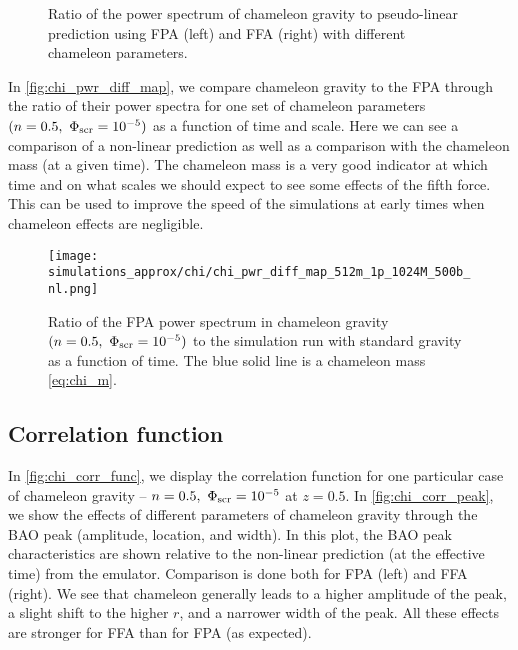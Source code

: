 \begin{figure*}[!tb]
  \centering
	\begin{subfigure}{1.2\textwidth}
		\chileft
	\end{subfigure}
	\begin{subfigure}{0.5\textwidth}
	\end{subfigure}%
	\begin{subfigure}{0.5\textwidth}
	\end{subfigure}
  \caption{Ratio of the power spectrum of chameleon gravity to pseudo-linear prediction using FPA (left) and FFA (right) with different chameleon parameters.}
  \label{fig:CHI_FP_diff_lin_ratio}
\end{figure*}

In \autoref{fig:chi_pwr_diff_map}, we compare chameleon gravity to the FPA through the ratio of their power spectra for one set of chameleon parameters $(n=0.5,\ \Phi_{\text{\scriptsize scr}}=10^{-5})$ as a function of time and scale. Here we can see a comparison of a non-linear prediction as well as a comparison with the chameleon mass (at a given time). The chameleon mass is a very good indicator at which time and on what scales we should expect to see some effects of the fifth force. This can be used to improve the speed of the simulations at early times when chameleon effects are negligible.
\begin{figure}[tb]
	\centering
	\chileft
	\texttt{[image: simulations\_approx/chi/chi\_pwr\_diff\_map\_512m\_1p\_1024M\_500b\_nl.png]}
	\caption{Ratio of the FPA power spectrum in chameleon gravity $(n=0.5,\ \Phi_{\text{\scriptsize scr}}=10^{-5})$ to the simulation run with standard gravity as a function of time. The blue solid line is a chameleon mass \eqref{eq:chi_m}.}
	\label{fig:chi_pwr_diff_map}
\end{figure}

\subsection{Correlation function}
In \autoref{fig:chi_corr_func}, we display the correlation function for one particular case of chameleon gravity -- $n=0.5,\ \Phi_{\text{\scriptsize scr}}=10^{-5}$ at $z=0.5$. In \autoref{fig:chi_corr_peak}, we show the effects of different parameters of chameleon gravity through the BAO peak (amplitude, location, and width). In this plot, the BAO peak characteristics are shown relative to the non-linear prediction (at the effective time) from the emulator. Comparison is done both for FPA (left) and FFA (right). We see that chameleon generally leads to a higher amplitude of the peak, a slight shift to the higher $r$, and a narrower width of the peak. All these effects are stronger for FFA than for FPA (as expected).

